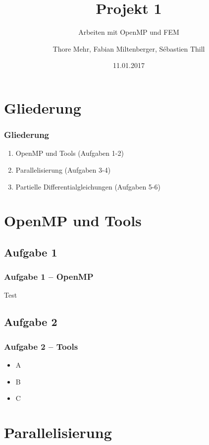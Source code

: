 \documentclass[german,notes,18pt]{beamer}
\title{Projekt 1}
\subtitle{Arbeiten mit OpenMP und FEM}
\author{Thore Mehr, Fabian Miltenberger, Sébastien Thill}
\date{11.01.2017}
\institute{Lehrstuhl für Rechnerarchitektur und Parallelverarbeitung (ITEC)}
\begin{document}
	
	\frame{\titlepage}
	
	\section{Gliederung}
	\begin{frame}
		\frametitle{Gliederung}
		
		\begin{enumerate}
			\item OpenMP und Tools (Aufgaben 1-2)
			\item Parallelisierung (Aufgaben 3-4)
			\item Partielle Differentialgleichungen (Aufgaben 5-6)
		\end{enumerate}
	\end{frame}

	\section{OpenMP und Tools}
	\subsection{Aufgabe 1}
	\begin{frame}
		\frametitle{Aufgabe 1 -- OpenMP}
		
		Test
	\end{frame}

	\subsection{Aufgabe 2}
	\begin{frame}
		\frametitle{Aufgabe 2 -- Tools}
		
		\begin{itemize}
			\item A
			\item B
			\item C
		\end{itemize}
	\end{frame}
	
	
	
	\section{Parallelisierung}
\end{document}
